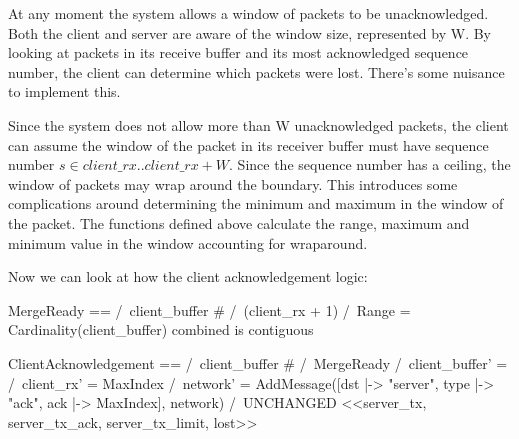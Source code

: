 At any moment the system allows a window of packets to be unacknowledged. Both
the client and server are aware of the window size, represented by W. By looking
at packets in its receive buffer and its most acknowledged sequence number, the
client can determine which packets were lost. There's some nuisance 
to implement this.\newline

Since the system does not allow more than W unacknowledged packets, the client
can assume the window of the packet in its receiver buffer must have sequence number
$s \in client\_rx ..client\_rx+W$. Since the sequence number has a ceiling, the
window of packets may wrap around the boundary. This introduces some
complications around determining the minimum and maximum in the window of the packet.
The functions defined above calculate the range, maximum and minimum value in
the window accounting for wraparound.\newline

Now we can look at how the client acknowledgement logic:\newline
\begin{tla}
MergeReady == 
    /\ client_buffer # {}
    /\ (client_rx + 1) %
    /\ Range = Cardinality(client_buffer)   \* combined is contiguous 

ClientAcknowledgement == 
    /\ client_buffer # {}
    /\ MergeReady 
    /\ client_buffer' = {}
    /\ client_rx' = MaxIndex
    /\ network' = AddMessage([dst |-> "server",
                              type |-> "ack",
                              ack |-> MaxIndex], 
                                network)
    /\ UNCHANGED <<server_tx, server_tx_ack, server_tx_limit, lost>>
\end{tla}
\begin{tlatex}
%
%
%
\@xx{}%
%
%
\@xx{}%
\@pvspace{8.0pt}%
%
%
%
%
%
 \@x{\@s{16.4} \.{\land} network \.{'} \.{=} AddMessage ( [ dst
 \.{\mapsto}\@w{server} ,\,}%
%
\@x{\@s{16.4} ack \.{\mapsto} MaxIndex ] ,\,}%
%
\end{tlatex}
\newline

